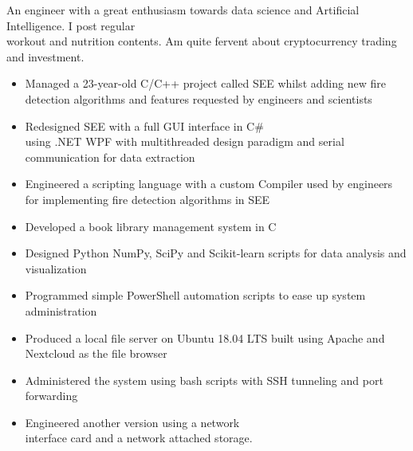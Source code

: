 \documentclass[11pt,a4paper,ragged2e]{altacv}
\begin{document}
\begin{paracol}{2}
\smallskip
{}

An engineer with a great enthusiasm towards data science and Artificial Intelligence. I post regular \\workout and nutrition contents. Am quite fervent about cryptocurrency trading and investment. \smallskip

\begin{itemize}
\item Managed a 23-year-old C/C++ project called SEE whilst adding new fire detection algorithms and features requested by engineers and scientists 
\item Redesigned SEE with a full GUI interface in C\#\\
using .NET WPF with multithreaded design paradigm and serial communication for data extraction 
\item Engineered a scripting language with a custom Compiler used by engineers for implementing fire detection algorithms in SEE
\end{itemize}
\divider

\begin{itemize}
\item Developed a book library management system in C 
\item Designed Python NumPy, SciPy and Scikit-learn scripts for data analysis and visualization
\item Programmed simple PowerShell automation scripts to ease up system administration
\end{itemize}
\divider

\begin{itemize}
\item Produced a local file server on Ubuntu 18.04 LTS built using Apache and Nextcloud as the file browser
\item Administered the system using bash scripts with SSH tunneling and port forwarding
\item Engineered another version using a network \\ interface card and a network attached storage.
\end{itemize}
\divider


\end{paracol}
\end{document}
